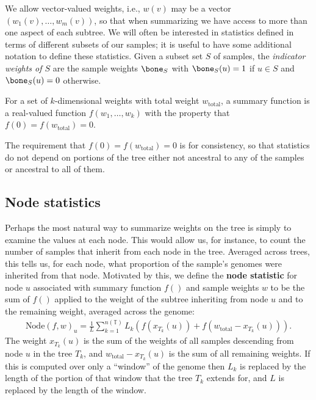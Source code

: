 \documentclass{article}
\newcommand{\node}{\mbox{Node}} %
\newcommand{\treeseq}{\mathbb{T}} %
\newcommand{\iw}{w} %
\newcommand{\tiw}{w_\text{total}} %
\newcommand{\nw}{x} %
\begin{document}
We allow vector-valued weights,
i.e., $\iw(v)$ may be a vector $(\iw_1(v), \ldots, \iw_m(v))$,
so that when summarizing we have access to more than one aspect of each subtree.
We will often be interested in statistics defined in terms of different subsets of our samples;
it is useful to have some additional notation to define these statistics.
Given a subset set $S$ of samples,
the \emph{indicator weights of $S$} are the sample weights $\bone_S$ with
$\bone_S(u) = 1$ if $u \in S$ and $\bone_S(u) = 0$ otherwise.

\begin{definition}
    For a set of $k$-dimensional weights with total weight $\tiw$,
    a summary function is a real-valued function $f(w_1, \ldots, w_k)$
    with the property that $f(0) = f(\tiw) = 0$.
\end{definition}

The requirement that $f(0) = f(\tiw) = 0$ is for consistency,
so that statistics do not depend on portions of the tree either not ancestral to any of the samples or ancestral to all
of them.



\subsection*{Node statistics}

Perhaps the most natural way to summarize weights on the tree
is simply to examine the values at each node.
This would allow us, for instance, to
count the number of samples that inherit from each node in the tree.
Averaged across trees,
this tells us, for each node, what proportion of the sample's genomes were inherited from that node.
Motivated by this, we define the
\textbf{node statistic} for node $u$
associated with summary function $f()$ and sample weights $\iw$
to be the sum of $f()$ applied to the weight of the subtree inheriting from node $u$
and to the remaining weight,
averaged across the genome:
\begin{align}
    \node(f, \iw)_u
    =
    \frac{1}{L} \sum_{k=1}^{n(\treeseq)} L_k \left( f(\nw_{T_k}(u)) + f(\tiw - \nw_{T_k}(u)) \right).
\end{align}
The weight $\nw_{T_k}(u)$ is the sum of the weights of all samples descending from node $u$
in the tree $T_k$,
and $\tiw - \nw_{T_k}(u)$ is the sum of all remaining weights.
If this is computed over only a ``window'' of the genome
then $L_k$ is replaced by the length of the portion of that window that the tree $T_k$ extends for,
and $L$ is replaced by the length of the window.
\end{document}
